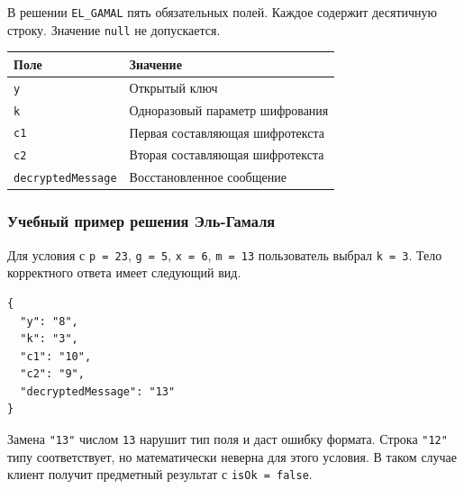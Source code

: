 \documentclass[12pt,a4paper]{article}
\begin{document}
В решении \texttt{EL\_GAMAL} пять обязательных полей. Каждое содержит десятичную строку. Значение \texttt{null} не допускается.

{\def\LTcaptype{none} %
\begin{longtable}[]{@{}
  >{\raggedright\arraybackslash}p{}
  >{\raggedright\arraybackslash}p{}@{}}
\toprule\noalign{}
\begin{minipage}[b]{\linewidth}\raggedright
Поле
\end{minipage} & \begin{minipage}[b]{\linewidth}\raggedright
Значение
\end{minipage} \\
\midrule\noalign{}
\endhead
\bottomrule\noalign{}
\endlastfoot
\texttt{y} & Открытый ключ \\
\texttt{k} & Одноразовый параметр шифрования \\
\texttt{c1} & Первая составляющая шифротекста \\
\texttt{c2} & Вторая составляющая шифротекста \\
\texttt{decryptedMessage} & Восстановленное сообщение \\
\end{longtable}
}

\subsubsection{Учебный пример решения Эль-Гамаля}\label{ux443ux447ux435ux431ux43dux44bux439-ux43fux440ux438ux43cux435ux440-ux440ux435ux448ux435ux43dux438ux44f-ux44dux43bux44c-ux433ux430ux43cux430ux43bux44f}

\hypertarget{учебный-пример-решения-эль-гамаля}{}

Для условия с \texttt{p\ =\ 23}, \texttt{g\ =\ 5}, \texttt{x\ =\ 6}, \texttt{m\ =\ 13} пользователь выбрал \texttt{k\ =\ 3}. Тело корректного ответа имеет следующий вид.

\begin{verbatim}
{
  "y": "8",
  "k": "3",
  "c1": "10",
  "c2": "9",
  "decryptedMessage": "13"
}
\end{verbatim}

Замена \texttt{"13"} числом \texttt{13} нарушит тип поля и даст ошибку формата. Строка \texttt{"12"} типу соответствует, но математически неверна для этого условия. В таком случае клиент получит предметный результат с \texttt{isOk\ =\ false}.
\end{document}
